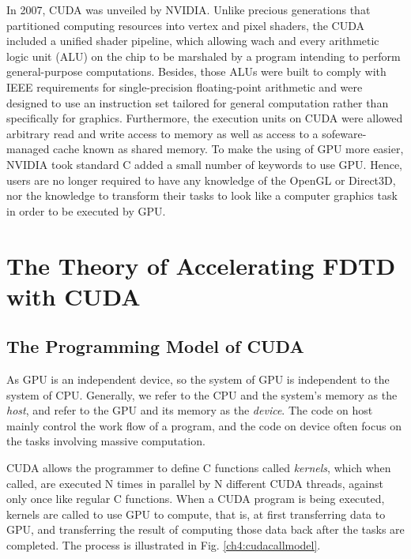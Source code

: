 In 2007, CUDA was unveiled by NVIDIA. Unlike precious generations that partitioned computing resources into vertex and pixel shaders, the CUDA included a unified shader pipeline, which allowing wach and every arithmetic logic unit (ALU) on the chip to be marshaled by a program intending to perform general-purpose computations. Besides, those ALUs were built to comply with IEEE requirements for single-precision floating-point arithmetic and were designed to use an instruction set tailored for general computation rather than specifically for graphics. Furthermore, the execution units on CUDA were allowed arbitrary read and write access to memory as well as access to a sofeware-managed cache known as shared memory. To make the using of GPU more easier, NVIDIA took standard C added a small number of keywords to use GPU. Hence, users are no longer required to have any knowledge of the OpenGL or Direct3D, nor the knowledge to transform their tasks to look like a computer graphics task in order to be executed by GPU.


\section{The Theory of Accelerating FDTD with CUDA}

\subsection{The Programming Model of CUDA}

As GPU is an independent device, so the system of GPU is independent to the system of CPU. Generally, we refer to the CPU and the system's memory as the \textit{host}, and refer to the GPU and its memory as the \textit{device}. The code on host mainly control the work flow of a program, and the code on device often focus on the tasks involving massive computation. 

CUDA allows the programmer to define C functions called \textit{kernels}, which when called, are executed N times in parallel by N different CUDA threads, against only once like regular C functions. When a CUDA program is being executed, kernels are called to use GPU to compute, that is, at first transferring data to GPU, and transferring the result of computing those data back after the tasks are completed. The process is illustrated in Fig. \ref{ch4:cudacallmodel}.

